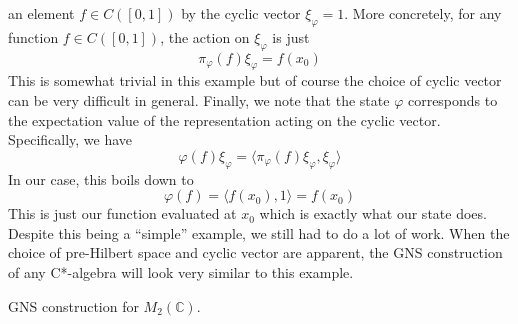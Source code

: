 \begin{example}
an element $f \in C([0,1])$ by the cyclic vector $\xi_\varphi = 1$. More concretely, for
any function $f \in C([0,1])$, the action on $\xi_\varphi$ is just
\begin{equation*}
    \pi_\varphi(f)\xi_\varphi = f(x_0)
\end{equation*}
This is somewhat trivial in this example but of course the choice of cyclic vector
can be very difficult in general. Finally, we note that the state  $\varphi$ corresponds
 to the expectation value of the representation acting on the cyclic vector.
Specifically, we have
\begin{equation*}
    \varphi(f)\xi_\varphi = \langle \pi_\varphi (f) \xi_\varphi, \xi_\varphi \rangle
\end{equation*}
In our case, this boils down to
\begin{equation*}
    \varphi(f) = \langle f(x_0), 1 \rangle = f(x_0)
\end{equation*}
This is just our function evaluated at $x_0$ which is exactly what our state does.
Despite this being a ``simple'' example, we still had to do a lot of work. When
the choice of pre-Hilbert space and cyclic vector are apparent, the GNS construction
of any C*-algebra will look very similar to this example.
\end{example}


\begin{example}
GNS construction for \( M_2(\mathbb{C}) \).
\end{example}